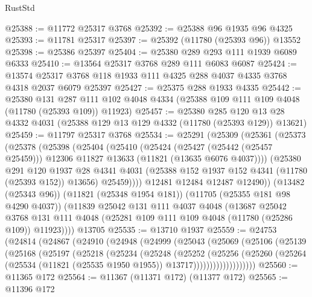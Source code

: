 \begin{lexlean}{RustStd}
\begin{coremodule}
@25388 := @11772 @25317 @3768
@25392 := @25388 @96 @1935 @96 @4325
@25393 := @11781 @25317
@25397 := @25392 (@11780 (@25393 @96)) @13552
@25398 := @25386 @25397
@25404 := @25380 @289 @293 @111 @1939 @6089 @6333
@25410 := @13564 @25317 @3768 @289 @111 @6083 @6087
@25424 := @13574 @25317 @3768 @118 @1933 @111 @4325 @288 @4037 @4335 @3768 @4318 @2037 @6079 @25397
@25427 := @25375 @288 @1933 @4335
@25442 := @25380
    @131
    @287
    @111
    @102
    @4048
    @4334
    (@25388 @109 @111 @109 @4048 (@11780 (@25393 @109)) @11923)
@25457 := @25380
    @285
    @120
    @13
    @28
    @4332
    @4031
    (@25388 @129 @13 @129 @4332 (@11780 (@25393 @129)) @13621)
@25459 := @11797 @25317 @3768
@25534 := @25291
    (@25309
      (@25361
        (@25373
          (@25378
            (@25398
              (@25404
                (@25410
                  (@25424
                    (@25427 (@25442 (@25457 @25459)))
                    @12306
                    @11827
                    @13633
                    (@11821 (@13635 @6076 @4037))))
                (@25380
                  @291
                  @120
                  @1937
                  @28
                  @4341
                  @4031
                  (@25388 @152 @1937 @152 @4341 (@11780 (@25393 @152)) @13656)
                  @25459))))
          @12481
          @12484
          @12487
          @12490))
      (@13482 (@25343 @96))
      (@11821 (@25348 @1954 @181))
      (@11705 (@25355 @181 @98 @4290 @4037))
      (@11839
        @25042
        @131
        @111
        @4037
        @4048
        (@13687
          @25042
          @3768
          @131
          @111
          @4048
          (@25281 @109 @111 @109 @4048 (@11780 (@25286 @109)) @11923))))
    @13705
@25535 := @13710 @1937
@25559 := @24753
    (@24814
      (@24867
        (@24910
          (@24948
            (@24999
              (@25043
                (@25069
                  (@25106
                    (@25139
                      (@25168
                        (@25197
                          (@25218
                            (@25234
                              (@25248
                                (@25252
                                  (@25256
                                    (@25260
                                      (@25264
                                        (@25534
                                          (@11821 (@25535 @1950 @1955))
                                          @13717)))))))))))))))))))
@25560 := @11365 @172
@25564 := @11367 (@11371 @172) (@11377 @172)
@25565 := @11396 @172

\end{coremodule}
\end{lexlean}
